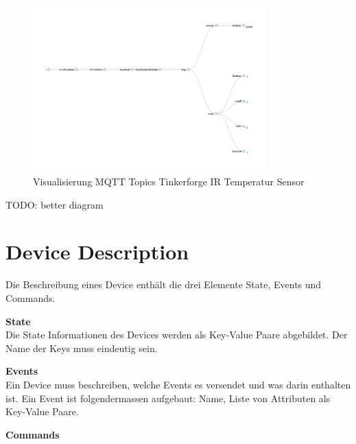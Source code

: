 \begin{figure}[H]
	\centering
		\includegraphics[width=0.8\textwidth]{bilder/TopicHierarchie_Bsp_Dualbutton.png}
	\caption{\label{fig:tempitTopics}Visualisierung MQTT Topics Tinkerforge IR Temperatur Sensor}
\end{figure}

TODO: better diagram



\section{Device Description}

Die Beschreibung eines Device enthält die drei Elemente State, Events und Commands.

\textbf{State} \\
Die State Informationen des Devices werden als Key-Value Paare abgebildet. Der Name der Keys muss eindeutig sein.

\textbf{Events} \\
Ein Device muss beschreiben, welche Events es versendet und was darin enthalten ist.
Ein Event ist folgendermassen aufgebaut:
Name, Liste von Attributen als Key-Value Paare.

\textbf{Commands}